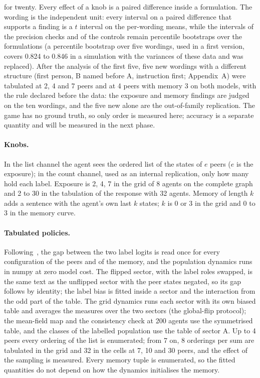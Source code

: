 \documentclass[11pt]{article}
\begin{document}
for twenty. Every effect of a knob is a paired difference inside a
formulation. The wording is the independent unit: every interval on a
paired difference that supports a finding is a $t$ interval on the
per-wording means, while the intervals of the precision checks and of the
controls remain percentile bootstraps over the formulations (a percentile
bootstrap over five wordings, used in a first version, covers 0.824 to
0.846 in a simulation with the variances of these data and was
replaced). After the analysis of the first five, five new wordings with a different structure
(first person, B named before A, instruction first; Appendix~A) were
tabulated at 2, 4 and 7 peers and at 4 peers with memory 3 on both
models, with the rule declared before the data: the exposure and memory
findings are judged on the ten wordings, and the five new alone are the
out-of-family replication.
The game has no ground truth, so only order is measured here; accuracy is a separate quantity and will be measured in the next phase.

\paragraph{Knobs.} In the list channel the agent sees the ordered list of
the states of $e$ peers ($e$ is the exposure); in the count channel, used as
an internal replication, only how many hold each label. Exposure is 2, 4,
7 in the grid of 8 agents on the complete graph and 2 to 30 in the
tabulation of the response with 32 agents. Memory of length $k$ adds a
sentence with the agent's own last $k$ states; $k$ is 0 or 3 in the grid
and 0 to 3 in the memory curve.

\paragraph{Tabulated policies.} Following~\cite{flint2026}, the gap between
the two label logits is read once for every configuration of the peers
and of the memory, and the population dynamics runs in numpy at zero model
cost. The flipped sector, with the label roles swapped, is the same text as
the unflipped sector with the peer states negated, so its gap follows by
identity; the label bias is fitted inside a sector and the interaction
from the odd part of the table. The grid dynamics runs each sector with its
own biased table and averages the measures over the two sectors (the
global-flip protocol); the mean-field map and the consistency check at 200
agents use the symmetrised table, and the classes of the labelled
population use the table of sector A. Up to 4 peers every ordering of the list is enumerated;
from 7 on, 8 orderings per sum are tabulated in the grid and 32 in the
cells at 7, 10 and 30 peers, and the effect of the sampling is measured.
Every memory tuple is enumerated, so the fitted quantities do not depend on
how the dynamics initialises the memory.
\end{document}
